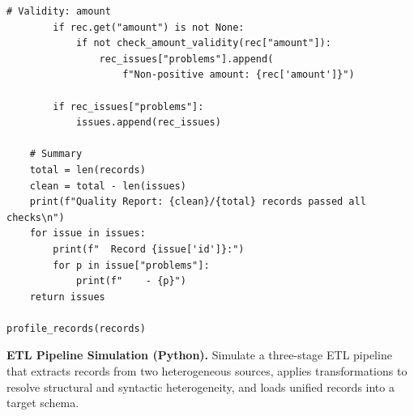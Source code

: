 \begin{lstlisting}[style=pyspark, caption={PE2.2: Data quality profiler}]
        # Validity: amount
        if rec.get("amount") is not None:
            if not check_amount_validity(rec["amount"]):
                rec_issues["problems"].append(
                    f"Non-positive amount: {rec['amount']}")

        if rec_issues["problems"]:
            issues.append(rec_issues)

    # Summary
    total = len(records)
    clean = total - len(issues)
    print(f"Quality Report: {clean}/{total} records passed all checks\n")
    for issue in issues:
        print(f"  Record {issue['id']}:")
        for p in issue["problems"]:
            print(f"    - {p}")
    return issues

profile_records(records)
\end{lstlisting}

\pe \textbf{ETL Pipeline Simulation (Python).}
Simulate a three-stage ETL pipeline that extracts records from two
heterogeneous sources, applies transformations to resolve structural
and syntactic heterogeneity, and loads unified records into a target
schema.

